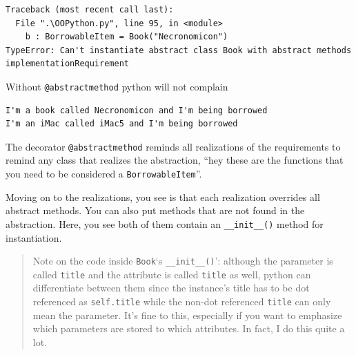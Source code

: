 \begin{Shaded}
\begin{Highlighting}[]
\NormalTok{):}
\end{Highlighting}
\end{Shaded}

\begin{verbatim}
Traceback (most recent call last):
  File ".\OOPython.py", line 95, in <module>
    b : BorrowableItem = Book("Necronomicon")
TypeError: Can't instantiate abstract class Book with abstract methods implementationRequirement
\end{verbatim}

Without \texttt{@abstractmethod} python will not complain

\begin{Shaded}
\begin{Highlighting}[]
\NormalTok{):}
\end{Highlighting}
\end{Shaded}

\begin{verbatim}
I'm a book called Necronomicon and I'm being borrowed
I'm an iMac called iMac5 and I'm being borrowed
\end{verbatim}

The decorator \texttt{@abstractmethod} reminds all realizations of the
requirements to remind any class that realizes the abstraction, ``hey
these are the functions that you need to be considered a
\texttt{BorrowableItem}''.

Moving on to the realizations, you see is that each realization
overrides all abstract methods. You can also put methods that are not
found in the abstraction. Here, you see both of them contain an
\texttt{\_\_init\_\_()} method for instantiation.

\begin{quote}
Note on the code inside \texttt{Book}`s \texttt{\_\_init\_\_()}':
although the parameter is called \texttt{title} and the attribute is
called \texttt{title} as well, python can differentiate between them
since the instance's title has to be dot referenced as
\texttt{self.title} while the non-dot referenced \texttt{title} can only
mean the parameter. It's fine to this, especially if you want to
emphasize which parameters are stored to which attributes. In fact, I do
this quite a lot.
\end{quote}

